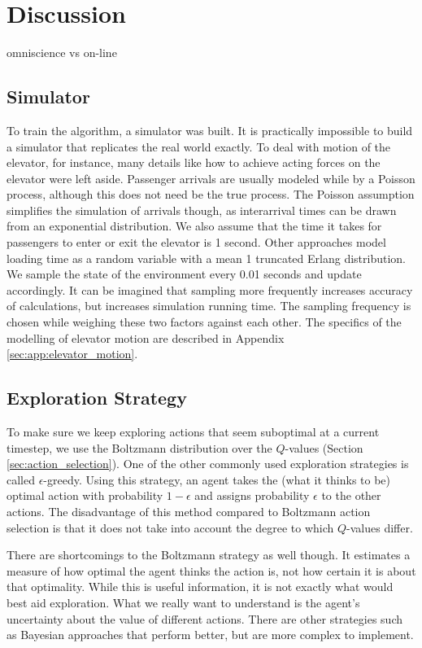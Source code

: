 \section{Discussion}

omniscience vs on-line


\subsection{Simulator}

To train the algorithm, a simulator was built. It is practically impossible to build a simulator that replicates the real world exactly. To deal with motion of the elevator, for instance, many details like how to achieve acting forces on the elevator were left aside. Passenger arrivals are usually modeled while by a Poisson process, although this does not need be the true process. The Poisson assumption simplifies the simulation of arrivals though, as interarrival times can be drawn from an exponential distribution. We also assume that the time it takes for passengers to enter or exit the elevator is 1 second. Other approaches model loading time as a random variable with a mean 1 truncated Erlang distribution. We sample the state of the environment every 0.01 seconds and update accordingly. It can be imagined that sampling more frequently increases accuracy of calculations, but increases simulation running time. The sampling frequency is chosen while weighing these two factors against each other. The specifics of the modelling of elevator motion are described in Appendix \ref{sec:app:elevator_motion}.


\subsection{Exploration Strategy}

To make sure we keep exploring actions that seem suboptimal at a current timestep, we use the Boltzmann distribution over the $Q$-values (Section \ref{sec:action_selection}). One of the other commonly used exploration strategies is called $\epsilon$-greedy. Using this strategy, an agent takes the (what it thinks to be) optimal action with probability $1-\epsilon$ and assigns probability $\epsilon$ to the other actions. The disadvantage of this method compared to Boltzmann action selection is that it does not take into account the degree to which $Q$-values differ.

There are shortcomings to the Boltzmann strategy as well though. It estimates a measure of how optimal the agent thinks the action is, not how certain it is about that optimality. While this is useful information, it is not exactly what would best aid exploration. What we really want to understand is the agent’s uncertainty about the value of different actions. There are other strategies such as Bayesian approaches that perform better, but are more complex to implement.

